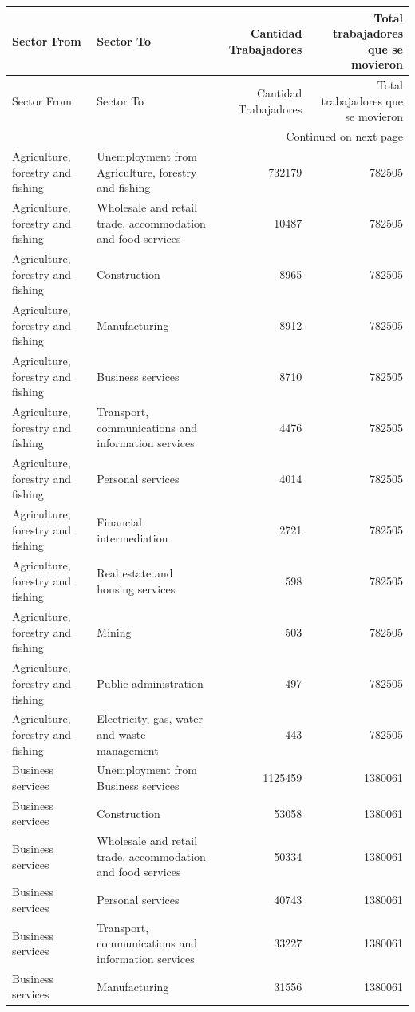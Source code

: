 \begin{longtable}{llrr}
\toprule
Sector From & Sector To & Cantidad Trabajadores & Total trabajadores que se movieron \\
\midrule
\endfirsthead
\toprule
Sector From & Sector To & Cantidad Trabajadores & Total trabajadores que se movieron \\
\midrule
\endhead
\midrule
\multicolumn{4}{r}{Continued on next page} \\
\midrule
\endfoot
\bottomrule
\endlastfoot
Agriculture, forestry and fishing & Unemployment from Agriculture, forestry and fishing & 732179 & 782505 \\
Agriculture, forestry and fishing & Wholesale and retail trade, accommodation and food services & 10487 & 782505 \\
Agriculture, forestry and fishing & Construction & 8965 & 782505 \\
Agriculture, forestry and fishing & Manufacturing & 8912 & 782505 \\
Agriculture, forestry and fishing & Business services & 8710 & 782505 \\
Agriculture, forestry and fishing & Transport, communications and information services & 4476 & 782505 \\
Agriculture, forestry and fishing & Personal services & 4014 & 782505 \\
Agriculture, forestry and fishing & Financial intermediation & 2721 & 782505 \\
Agriculture, forestry and fishing & Real estate and housing services & 598 & 782505 \\
Agriculture, forestry and fishing & Mining & 503 & 782505 \\
Agriculture, forestry and fishing & Public administration & 497 & 782505 \\
Agriculture, forestry and fishing & Electricity, gas, water and waste management & 443 & 782505 \\
Business services & Unemployment from Business services & 1125459 & 1380061 \\
Business services & Construction & 53058 & 1380061 \\
Business services & Wholesale and retail trade, accommodation and food services & 50334 & 1380061 \\
Business services & Personal services & 40743 & 1380061 \\
Business services & Transport, communications and information services & 33227 & 1380061 \\
Business services & Manufacturing & 31556 & 1380061 \\

\end{longtable}
